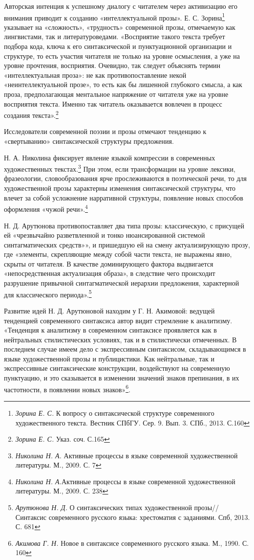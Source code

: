 \documentclass{kursa4}
\begin{document}
    Авторская интенция к успешному диалогу с читателем через активизацию его внимания приводит к созданию «интеллектуальной прозы». Е. С. Зорина\footnote{\textit{Зорина Е. С.} К вопросу о синтаксической структуре современного художественного текста. Вестник СПбГУ. Сер. 9. Вып. 3. СПб., 2013. С.160} указывает на «сложность», «трудность» современной прозы, отмечаемую как лингвистами, так и литературоведами. «Восприятие такого текста требует подбора кода, ключа к его синтаксической и пунктуационной организации и структуре, то есть участия читателя не только на уровне осмысления, а уже на уровне прочтения, восприятия. Очевидно, так следует объяснять термин «интеллектуальная проза»: не как противопоставление некой «неинтеллектуальной прозе», то есть как бы лишенной глубокого смысла, а как проза, предполагающая ментальное напряжение от читателя уже на уровне восприятия текста. Именно так читатель оказывается вовлечен в процесс создания текста».\footnote{\textit{Зорина Е. С.} Указ. соч. С.165} 

    Исследователи современной поэзии и прозы отмечают тенденцию к «свертыванию» синтаксической структуры предложения. 

    Н. А. Николина фиксирует явление языкой компрессии в современных художественных текстах.\footnote{\textit{Николина Н. А.} Активные процессы в языке современной художественной литературы. М., 2009. С. 7}  При  этом, если трансформации на уровне лексики, фразеологии, словообразования ярче прослеживаются в поэтической речи, то для художественной прозы характерны изменения синтаксической структуры, что влечет за собой усложнение нарративной структуры, появление новых способов оформления «чужой речи».\footnote{\textit{Николина Н. А.}Активные процессы в языке современной художественной литературы. М., 2009. С. 238}

    Н. Д. Арутюнова противопоставляет два типа прозы: классическую, с присущей ей «чрезвычайно разветвленной и тонко нюансированной системой синтагматических средств»», и пришедшую ей на смену актуализирующую прозу, где «элементы, скрепляющие между собой части текста, не выражены явно, скрыты от читателя. В качестве доминирующего фактора выдвигается «непосредственная актуализация образа», в следствие чего происходит разрушение привычной синтагматической иерархии предложения, характерной для классического периода».\footnote{\textit{Арутюнова Н. Д.} О синтаксических типах художественной прозы// Синтаксис современного русского языка: хрестоматия с заданиями. Спб, 2013. С. 681} 

    Развитие идей Н. Д. Арутюновой находим у Г. Н. Акимовой: ведущей тенденцией современного синтаксиса автор видит стремление к аналитизму. «Тенденция к аналитизму в современном синтаксисе проявляется как в нейтральных стилистических условиях, так и в стилистически отмеченных. В последнем случае имеем дело с экспрессивным синтаксисом, складывающимся в языке художественной прозы и публицистики. Как нейтральные, так и экспрессивные синтаксические конструкции, воздействуют на современную пунктуацию, и это сказывается в изменении значений знаков препинания, в их частотности, в появлении новых знаков»\footnote{\textit{Акимова Г. Н.} Новое в синтаксисе современного русского языка. М., 1990. С. 160}.
\end{document}
